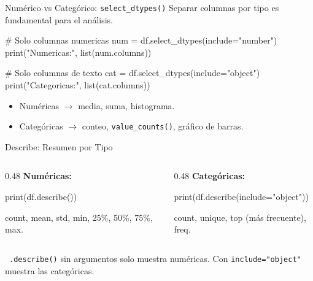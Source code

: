 \documentclass[aspectratio=169, 11pt]{beamer}
\begin{document}
\begin{frame}[fragile,shrink=28]{Numérico vs Categórico: \texttt{select\_dtypes()}}
  \vspace{-6pt}
  {\footnotesize
    Separar columnas por tipo es fundamental para el análisis.}

  \vspace{4pt}
  \begin{pyblock}
# Solo columnas numericas
num = df.select_dtypes(include="number")
print("Numericas:", list(num.columns))

# Solo columnas de texto
cat = df.select_dtypes(include="object")
print("Categoricas:", list(cat.columns))
  \end{pyblock}

  \vspace{4pt}
  {\scriptsize\color{textMuted}
  \begin{itemize}\setlength{\itemsep}{3pt}
    \item[{\color{arcaRed}\scriptsize\faArrowRight}]
      Numéricas $\to$ media, suma, histograma.
    \item[{\color{arcaRed}\scriptsize\faArrowRight}]
      Categóricas $\to$ conteo, \texttt{value\_counts()}, gráfico de barras.
  \end{itemize}
  }
\end{frame}

\begin{frame}[fragile,shrink=28]{Describe: Resumen por Tipo}
  \vspace{-6pt}
  \begin{columns}[T]
    \begin{column}{0.48\textwidth}
      {\scriptsize\color{arcaDark}\bfseries Numéricas:}
      \begin{pyblock}[minted options={fontsize=\scriptsize, breaklines}]
print(df.describe())
      \end{pyblock}
      \vspace{2pt}
      {\scriptsize\color{textMuted}
        count, mean, std, min, 25\%, 50\%, 75\%, max.}
    \end{column}

    \begin{column}{0.48\textwidth}
      {\scriptsize\color{arcaDark}\bfseries Categóricas:}
      \begin{pyblock}[minted options={fontsize=\scriptsize, breaklines}]
print(df.describe(include="object"))
      \end{pyblock}
      \vspace{2pt}
      {\scriptsize\color{textMuted}
        count, unique, top (más frecuente), freq.}
    \end{column}
  \end{columns}

  \vspace{6pt}
  {\scriptsize\color{textMuted}
    \faLightbulb\ \texttt{.describe()} sin argumentos solo muestra numéricas.
    Con \texttt{include="object"} muestra las categóricas.}
\end{frame}
\end{document}
